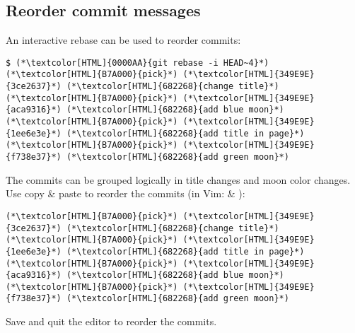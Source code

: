 \subsection{Reorder commit messages}
\begin{frame}[fragile]
  \subslidetitle
  An interactive rebase can be used to reorder commits:

  \begin{lstlisting}
$ (*\textcolor[HTML]{0000AA}{git rebase -i HEAD~4}*)
(*\textcolor[HTML]{B7A000}{pick}*) (*\textcolor[HTML]{349E9E}{3ce2637}*) (*\textcolor[HTML]{682268}{change title}*)
(*\textcolor[HTML]{B7A000}{pick}*) (*\textcolor[HTML]{349E9E}{aca9316}*) (*\textcolor[HTML]{682268}{add blue moon}*)
(*\textcolor[HTML]{B7A000}{pick}*) (*\textcolor[HTML]{349E9E}{1ee6e3e}*) (*\textcolor[HTML]{682268}{add title in page}*)
(*\textcolor[HTML]{B7A000}{pick}*) (*\textcolor[HTML]{349E9E}{f738e37}*) (*\textcolor[HTML]{682268}{add green moon}*)
\end{lstlisting}

  The commits can be grouped logically in title changes and moon color changes.\\
  Use copy \& paste to reorder the commits (in Vim:  \& ):

  \begin{lstlisting}
(*\textcolor[HTML]{B7A000}{pick}*) (*\textcolor[HTML]{349E9E}{3ce2637}*) (*\textcolor[HTML]{682268}{change title}*)
(*\textcolor[HTML]{B7A000}{pick}*) (*\textcolor[HTML]{349E9E}{1ee6e3e}*) (*\textcolor[HTML]{682268}{add title in page}*)
(*\textcolor[HTML]{B7A000}{pick}*) (*\textcolor[HTML]{349E9E}{aca9316}*) (*\textcolor[HTML]{682268}{add blue moon}*)
(*\textcolor[HTML]{B7A000}{pick}*) (*\textcolor[HTML]{349E9E}{f738e37}*) (*\textcolor[HTML]{682268}{add green moon}*)
\end{lstlisting}

  Save and quit the editor to reorder the commits.


\end{frame}



